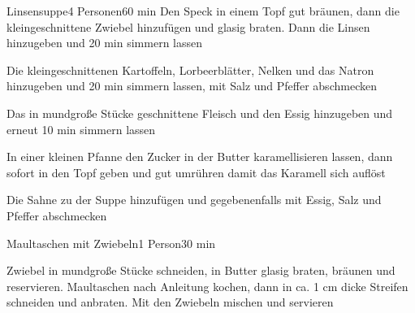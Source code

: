 
\begin{recipe}{Linsensuppe}{4 Personen}{60 min}
Den Speck in einem Topf gut bräunen, dann die kleingeschnittene Zwiebel hinzufügen und glasig braten. Dann die Linsen hinzugeben und 20 min simmern lassen

Die kleingeschnittenen Kartoffeln, Lorbeerblätter, Nelken und das Natron   hinzugeben und 20 min simmern lassen, mit Salz und Pfeffer abschmecken

Das in mundgroße Stücke geschnittene Fleisch und den Essig hinzugeben und erneut 10 min simmern lassen

In einer kleinen Pfanne den Zucker in der Butter karamellisieren lassen, dann sofort in den Topf geben und gut umrühren damit das Karamell sich auflöst

Die Sahne zu der Suppe hinzufügen und gegebenenfalls mit Essig, Salz und Pfeffer abschmecken
\end{recipe}



\begin{recipe}{Maultaschen mit Zwiebeln}{1 Person}{30 min}

Zwiebel in mundgroße Stücke schneiden, in Butter glasig braten, bräunen und reservieren. Maultaschen nach Anleitung kochen, dann in ca. 1 cm dicke Streifen schneiden und anbraten. Mit den Zwiebeln mischen und servieren
\end{recipe}


